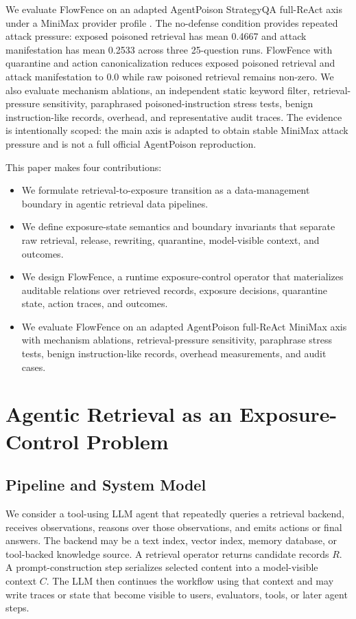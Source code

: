 \documentclass[conference]{IEEEtran}
\begin{document}
We evaluate FlowFence on an adapted AgentPoison StrategyQA full-ReAct axis under a MiniMax provider profile \cite{agentpoison}. The no-defense condition provides repeated attack pressure: exposed poisoned retrieval has mean 0.4667 and attack manifestation has mean 0.2533 across three 25-question runs. FlowFence with quarantine and action canonicalization reduces exposed poisoned retrieval and attack manifestation to 0.0 while raw poisoned retrieval remains non-zero. We also evaluate mechanism ablations, an independent static keyword filter, retrieval-pressure sensitivity, paraphrased poisoned-instruction stress tests, benign instruction-like records, overhead, and representative audit traces. The evidence is intentionally scoped: the main axis is adapted to obtain stable MiniMax attack pressure and is not a full official AgentPoison reproduction.

This paper makes four contributions:
\begin{itemize}
    \item We formulate retrieval-to-exposure transition as a data-management boundary in agentic retrieval data pipelines.
    \item We define exposure-state semantics and boundary invariants that separate raw retrieval, release, rewriting, quarantine, model-visible context, and outcomes.
    \item We design FlowFence, a runtime exposure-control operator that materializes auditable relations over retrieved records, exposure decisions, quarantine state, action traces, and outcomes.
    \item We evaluate FlowFence on an adapted AgentPoison full-ReAct MiniMax axis with mechanism ablations, retrieval-pressure sensitivity, paraphrase stress tests, benign instruction-like records, overhead measurements, and audit cases.
\end{itemize}

\section{Agentic Retrieval as an Exposure-Control Problem}

\subsection{Pipeline and System Model}

We consider a tool-using LLM agent that repeatedly queries a retrieval backend, receives observations, reasons over those observations, and emits actions or final answers. The backend may be a text index, vector index, memory database, or tool-backed knowledge source. A retrieval operator returns candidate records $R$. A prompt-construction step serializes selected content into a model-visible context $C$. The LLM then continues the workflow using that context and may write traces or state that become visible to users, evaluators, tools, or later agent steps.
\end{document}
